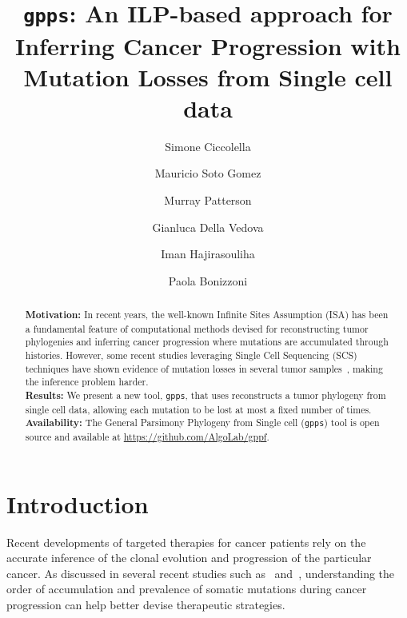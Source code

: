 \documentclass[a4paper,USenglish]{article}
\title{\texttt{gpps}: An ILP-based approach for Inferring Cancer Progression with Mutation Losses
  from Single cell data}
\author{Simone Ciccolella \and   Mauricio Soto Gomez \and
  Murray Patterson \and
  Gianluca Della Vedova \and
  Iman Hajirasouliha \and
  Paola Bonizzoni}
\theoremstyle{definition}
\begin{document}

\maketitle

\begin{abstract}
\textbf{Motivation:} In recent years, the well-known Infinite Sites Assumption (ISA) has
been a fundamental feature of computational methods devised for reconstructing tumor
phylogenies and inferring cancer progression where mutations are accumulated through
histories.
However, some recent studies leveraging Single Cell Sequencing (SCS) techniques have shown
evidence of mutation losses in several tumor samples~\cite{Kuipers13102017}, making the inference problem harder.\\
\textbf{Results:}
We present a new tool, \texttt{gpps}, that uses reconstructs a tumor phylogeny from single
cell data, allowing each mutation to be lost at most a fixed number of times.\\
\textbf{Availability:} The General Parsimony Phylogeny from Single cell (\texttt{gpps})
tool is open source and available at   \url{https://github.com/AlgoLab/gppf}.\\
\end{abstract}

\section{Introduction}

Recent developments of targeted therapies for cancer patients rely on the accurate inference of the clonal evolution and progression of the particular cancer. As discussed in several recent studies such as~\cite{Morrissy2016} and~\cite{Wang2016}, understanding the order of accumulation and prevalence of somatic mutations during cancer progression can help better devise therapeutic strategies.
\end{document}
